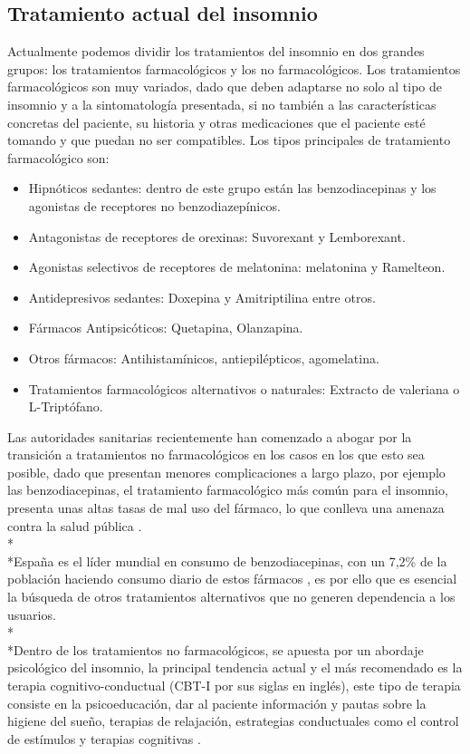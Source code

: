\documentclass[a4paper,12pt,twoside]{memoir}
\begin{document}
\begin{itemize}
    \subsection{Tratamiento actual del insomnio}
    \text Actualmente podemos dividir los tratamientos del insomnio en dos grandes grupos: los tratamientos farmacológicos y los no farmacológicos.
Los tratamientos farmacológicos son muy variados, dado que deben adaptarse no solo al tipo de insomnio y a la sintomatología presentada, si no también a las características concretas del paciente, su historia y otras medicaciones que el paciente esté tomando y que puedan no ser compatibles. Los tipos principales de tratamiento farmacológico son:
    \begin{itemize}
        \item Hipnóticos sedantes: dentro de este grupo están las benzodiacepinas y los agonistas de receptores no benzodiazepínicos.
    \item Antagonistas de receptores de orexinas: Suvorexant y Lemborexant.
    \item Agonistas selectivos de receptores de melatonina: melatonina y Ramelteon.
    \item Antidepresivos sedantes: Doxepina y Amitriptilina entre otros.
    \item Fármacos Antipsicóticos: Quetapina, Olanzapina.
    \item Otros fármacos: Antihistamínicos, antiepilépticos, agomelatina.
    \item Tratamientos farmacológicos alternativos o naturales: Extracto de valeriana o L-Triptófano\cite{Contreras2021}.
    \end{itemize}
    
    \text Las autoridades sanitarias recientemente han comenzado a abogar por la transición a tratamientos no farmacológicos en los casos en los que esto sea posible, dado que presentan menores complicaciones a largo plazo, por ejemplo las benzodiacepinas, el tratamiento farmacológico más común para el insomnio, presenta unas altas tasas de mal uso del fármaco, lo que conlleva una amenaza contra la salud pública \cite{votaw2019}. \\*\\*España es el líder mundial en consumo de benzodiacepinas, con un 7,2\% de la población haciendo consumo diario de estos fármacos \cite{diariofarma2023}, es por ello que es esencial la búsqueda de otros tratamientos alternativos que no generen dependencia a los usuarios.\\*\\*Dentro de los tratamientos no farmacológicos, se apuesta por un abordaje psicológico del insomnio, la principal tendencia actual y el más recomendado es la terapia cognitivo-conductual (CBT-I por sus siglas en inglés), este tipo de terapia consiste en la psicoeducación, dar al paciente información y pautas sobre la higiene del sueño, terapias de relajación, estrategias conductuales como el control de estímulos y terapias cognitivas \cite{riemann2017}.


\end{itemize}
\end{document}
